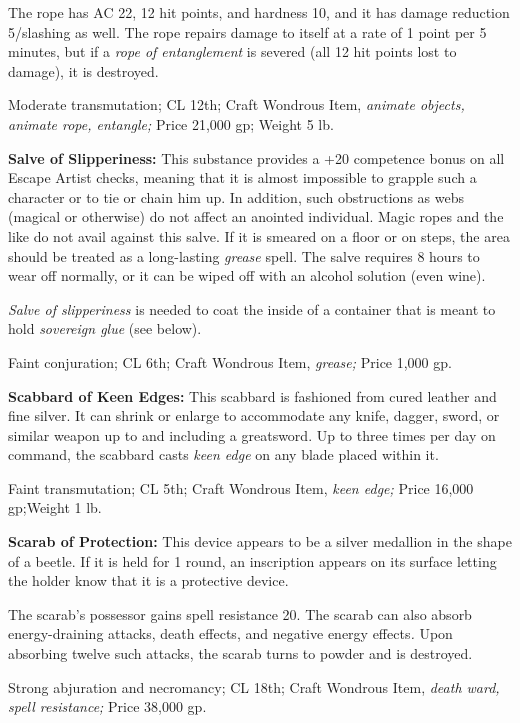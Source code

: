 The rope has AC 22, 12 hit points, and hardness 10, and it has damage reduction 
5/slashing as well. The rope repairs damage to itself at a rate of 1 point per 
5 minutes, but if a \textit{rope of entanglement }is severed (all 12 hit points 
lost to damage), it is destroyed.

Moderate transmutation; CL 12th; Craft Wondrous Item, \textit{animate objects, 
animate rope, entangle; }Price 21,000 gp; Weight 5 lb.

\textbf{Salve of Slipperiness:} This substance provides a +20 competence bonus 
on all Escape Artist checks, meaning that it is almost impossible to grapple such 
a character or to tie or chain him up. In addition, such obstructions as webs (magical 
or otherwise) do not affect an anointed individual. Magic ropes and the like do 
not avail against this salve. If it is smeared on a floor or on steps, the area 
should be treated as a long-lasting \textit{grease }spell. The salve requires 8 
hours to wear off normally, or it can be wiped off with an alcohol solution (even 
wine).

\textit{Salve of slipperiness }is needed to coat the inside of a container that 
is meant to hold \textit{sovereign glue }(see below).

Faint conjuration; CL 6th; Craft Wondrous Item, \textit{grease; }Price 1,000 gp.

\textbf{Scabbard of Keen Edges:} This scabbard is fashioned from cured leather 
and fine silver. It can shrink or enlarge to accommodate any knife, dagger, sword, 
or similar weapon up to and including a greatsword. Up to three times per day on 
command, the scabbard casts \textit{keen edge }on any blade placed within it.

Faint transmutation; CL 5th; Craft Wondrous Item, \textit{keen edge; }Price 16,000 
gp;Weight 1 lb.

\textbf{Scarab of Protection:} This device appears to be a silver medallion in 
the shape of a beetle. If it is held for 1 round, an inscription appears on its 
surface letting the holder know that it is a protective device.

The scarab's possessor gains spell resistance 20. The scarab can also absorb energy-draining 
attacks, death effects, and negative energy effects\textit{. }Upon absorbing twelve 
such attacks, the scarab turns to powder and is destroyed.

Strong abjuration and necromancy; CL 18th; Craft Wondrous Item, \textit{death ward, 
spell resistance; }Price 38,000 gp.

